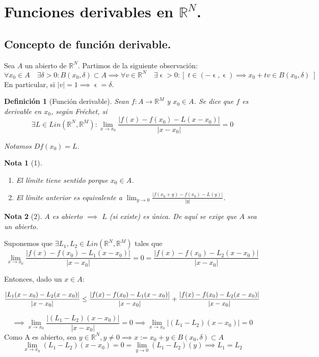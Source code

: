 \documentclass[11pt, a4paper, titlepage]{article}
\makeatletter
\let\epsilon\upvarepsilon
\renewenvironment{proof}[1][\proofname] {\vspace{-15pt}\par\pushQED{\qed}\normalfont\topsep6\p@\@plus6\p@\relax\trivlist\item[\hskip\labelsep\it#1\@addpunct{.}]\ignorespaces}{\popQED\endtrivlist\@endpefalse}
\theoremstyle{theorem-style}
\theoremstyle{definition-style}
\newtheorem*{ndef}{Definición}
\theoremstyle{remark-style}
\newtheorem*{nota}{Nota}
\theoremstyle{example-style}
\newenvironment{nlist}
{\begin{enumerate}
\renewcommand\labelenumi{(\emph{\roman{enumi})}}}
{\end{enumerate}}
\makeatother
\begin{document}
\section{Funciones derivables en $\mathbb{R}^N$.}
\subsection{Concepto de función derivable.}

Sea $A$ un abierto de $\mathbb{R}^N$. Partimos de la siguiente observación:
\[
	\forall x_0 \in A\quad \exists \delta >0 : B(x_0, \delta) \subset A \implies \forall v \in \mathbb{R}^N\quad \exists \epsilon > 0 : [\; t \in (-\epsilon, \epsilon) \implies x_0+tv\in B(x_0,\delta)\;]
\]
 En particular, si $|v| = 1 \implies \epsilon = \delta$.
 
\begin{ndef}[Función derivable] Sean $f : A \longrightarrow \mathbb{R}^M$ y $x_0\in A$. Se dice que $f$ es derivable en $x_0$, según Fréchet, si
\[
	\exists L\in Lin(\mathbb{R}^N, \mathbb{R}^M) : \lim_{x\to x_0} \frac{|f(x)-f(x_0)- L(x-x_0)|}{|x-x_0|} =0
\]

Notamos $Df(x_0) = L$.
\end{ndef}

\begin{nota}[1]\hfill
	\begin{nlist}
		\item El límite tiene sentido porque $x_0\in A$.
		\item El límite anterior es equivalente a $\lim_{y\to 0} \frac{|f(x_0+y)-f(x_0)-L(y)|}{|y|}$.
	\end{nlist}
\end{nota}

\begin{nota}[2]
	$A$ es abierto $\implies$ $L$ (si existe) es única. De aquí se exige que $A$ sea un abierto. 
\end{nota}

\begin{proof}[Demostración (Nota 2)]
	Suponemos que $\exists L_1,L_2\in Lin(\mathbb{R}^N, \mathbb{R}^M)$ tales que 
\[
\lim_{x\to x_0} \frac{|f(x)-f(x_0)- L_1(x-x_0)|}{|x-x_0|} =0= \frac{|f(x)-f(x_0)- L_2(x-x_0)|}{|x-x_0|}
\]

Entonces, dado un $x\in A$:

\begin{align}
	\frac{|L_1(x-x_0) - L_2(x-x_0)|}{|x-x_0|} \le \frac{|f(x)-f(x_0)- L_1(x-x_0)|}{|x-x_0|} + \frac{|f(x)-f(x_0)- L_2(x-x_0)|}{|x-x_0|}\notag
\end{align}

\[
\implies \lim_{x\to x_0} \frac{|(L_1-L_2)(x-x_0)|}{|x-x_0|} = 0 \implies \lim_{x\to x_0}|(L_1 -L_2)(x-x_0)|=0
\]
Como A es abierto, sea $y \in \mathbb{R}^N, y \neq 0 \implies x:=x_0+y \in B(x_0, \delta) \subset A$\\
$$\lim_{x\to x_0}(L_1-L_2)(x-x_0)=0=\lim_{y\to 0}(L_1-L_2)(y)\implies L_1=L_2$$
\end{proof}
\end{document}
